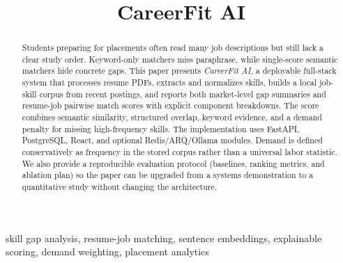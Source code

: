 \documentclass[conference]{IEEEtran}
\begin{document}
\title{CareerFit AI}

\author{
\and
{}
}

\maketitle

\begin{abstract}
Students preparing for placements often read many job descriptions but still lack a clear study order. Keyword-only matchers miss paraphrase, while single-score semantic matchers hide concrete gaps. This paper presents \textit{CareerFit AI}, a deployable full-stack system that processes resume PDFs, extracts and normalizes skills, builds a local job-skill corpus from recent postings, and reports both market-level gap summaries and resume-job pairwise match scores with explicit component breakdowns. The score combines semantic similarity, structured overlap, keyword evidence, and a demand penalty for missing high-frequency skills. The implementation uses FastAPI, PostgreSQL, React, and optional Redis/ARQ/Ollama modules. Demand is defined conservatively as frequency in the stored corpus rather than a universal labor statistic. We also provide a reproducible evaluation protocol (baselines, ranking metrics, and ablation plan) so the paper can be upgraded from a systems demonstration to a quantitative study without changing the architecture.
\end{abstract}

\begin{IEEEkeywords}
skill gap analysis, resume-job matching, sentence embeddings, explainable scoring, demand weighting, placement analytics
\end{IEEEkeywords}
\end{document}
